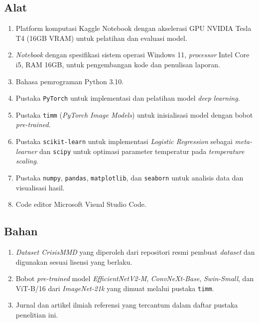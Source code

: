 \subsection{Alat} \label{III.Alat}
\begin{enumerate}[noitemsep]
    \item Platform komputasi Kaggle Notebook dengan akselerasi GPU
    NVIDIA Tesla T4 (16GB VRAM) untuk pelatihan dan evaluasi model.
    \item \textit{Notebook} dengan spesifikasi sistem operasi Windows 11,
    \textit{processor} Intel Core i5, RAM 16GB, untuk pengembangan kode
    dan penulisan laporan.
    \item Bahasa pemrograman Python 3.10.
    \item Pustaka \texttt{PyTorch} untuk implementasi dan pelatihan model
    \textit{deep learning}.
    \item Pustaka \texttt{timm} (\textit{PyTorch Image Models}) untuk
    inisialisasi model dengan bobot \textit{pre-trained}.
    \item Pustaka \texttt{scikit-learn} untuk implementasi \textit{Logistic
    Regression} sebagai \textit{meta-learner} dan \texttt{scipy} untuk
    optimasi parameter temperatur pada \textit{temperature scaling}.
    \item Pustaka \texttt{numpy}, \texttt{pandas}, \texttt{matplotlib},
    dan \texttt{seaborn} untuk analisis data dan visualisasi hasil.
    \item Code editor Microsoft Visual Studio Code.
\end{enumerate}

\subsection{Bahan} \label{III.Bahan}
\begin{enumerate}[noitemsep]
    \item \textit{Dataset CrisisMMD} yang diperoleh dari repositori resmi
    pembuat \textit{dataset} dan digunakan sesuai lisensi yang berlaku.
    \item Bobot \textit{pre-trained} model \textit{EfficientNetV2-M},
    \textit{ConvNeXt-Base}, \textit{Swin-Small}, dan ViT-B/16 dari
    \textit{ImageNet-21k} yang dimuat melalui pustaka \texttt{timm}.
    \item Jurnal dan artikel ilmiah referensi yang tercantum dalam daftar
    pustaka penelitian ini.
\end{enumerate}


